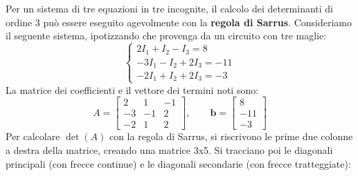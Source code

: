 Per un sistema di tre equazioni in tre incognite, il calcolo dei determinanti di ordine 3 può essere eseguito agevolmente con la \textbf{regola di Sarrus}. Consideriamo il seguente sistema, ipotizzando che provenga da un circuito con tre maglie:
\begin{equation}
\begin{cases}
2 I_1 + I_2 - I_3 = 8 \\
-3 I_1 - I_2 + 2 I_3 = -11 \\
-2 I_1 + I_2 + 2 I_3 = -3
\end{cases}
\label{eq:sistema_3x3_esempio}
\end{equation}
La matrice dei coefficienti e il vettore dei termini noti sono:
\begin{equation}
A = \begin{bmatrix}
2 & 1 & -1 \\
-3 & -1 & 2 \\
-2 & 1 & 2
\end{bmatrix},\qquad
\mathbf{b} = \begin{bmatrix}
8 \\ -11 \\ -3
\end{bmatrix}
\label{eq:matrice_3x3_esempio}
\end{equation}
Per calcolare \(\det(A)\) con la regola di Sarrus, si riscrivono le prime due colonne a destra della matrice, creando una matrice 3x5. Si tracciano poi le diagonali principali (con frecce continue) e le diagonali secondarie (con frecce tratteggiate):


